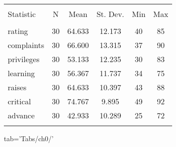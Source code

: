 \documentclass[]{article}
\newenvironment{Shaded}{\begin{snugshade}}{\end{snugshade}}
\newcommand{\StringTok}[1]{\textcolor[rgb]{0.31,0.60,0.02}{{#1}}}
\newcommand{\NormalTok}[1]{{#1}}
\begin{document}
\begin{table}[!htbp] \centering 
  \caption{} 
  \label{} 
\begin{tabular}{@{\extracolsep{5pt}}lccccc} 
\\[-1.8ex]\hline \\[-1.8ex] 
Statistic & \multicolumn{1}{c}{N} & \multicolumn{1}{c}{Mean} & \multicolumn{1}{c}{St. Dev.} & \multicolumn{1}{c}{Min} & \multicolumn{1}{c}{Max} \\ 
\hline \\[-1.8ex] 
rating & 30 & 64.633 & 12.173 & 40 & 85 \\ 
complaints & 30 & 66.600 & 13.315 & 37 & 90 \\ 
privileges & 30 & 53.133 & 12.235 & 30 & 83 \\ 
learning & 30 & 56.367 & 11.737 & 34 & 75 \\ 
raises & 30 & 64.633 & 10.397 & 43 & 88 \\ 
critical & 30 & 74.767 & 9.895 & 49 & 92 \\ 
advance & 30 & 42.933 & 10.289 & 25 & 72 \\ 
\hline \\[-1.8ex] 
\end{tabular} 
\end{table}

\begin{Shaded}
\begin{Highlighting}[]
\NormalTok{tab=}\StringTok{'Tabs/ch0/'}
\end{Highlighting}
\end{Shaded}


\end{document}
